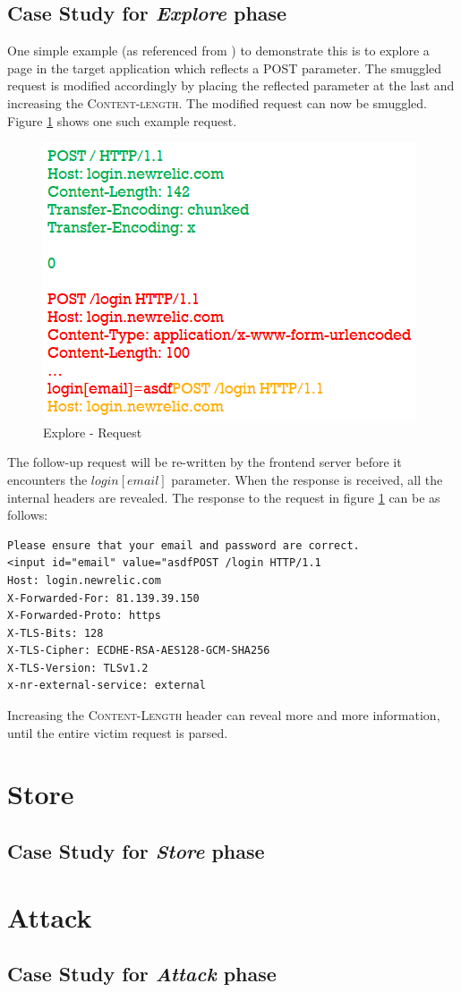 \subsection{Case Study for \textit{Explore} phase}
One simple example (as referenced from \cite{b6}) to demonstrate this is to explore a page in the target application which reflects a POST parameter. The smuggled request is modified accordingly by placing the reflected parameter at the last and increasing the \textsc{Content-length}. The modified request can now be smuggled. Figure \ref{fig:Explore_Request} shows one such example request.\\ 
\begin{figure}
	\includegraphics{images/Explore_Request}
	\caption{Explore - Request}
	\label{fig:Explore_Request}
\end{figure}
The follow-up request will be re-written by the frontend server before it encounters the $login[email]$ parameter. When the response is received, all the internal headers are revealed. 
The response to the request in figure \ref{fig:Explore_Request} can be as follows:
\begin{verbatim}
Please ensure that your email and password are correct.
<input id="email" value="asdfPOST /login HTTP/1.1
Host: login.newrelic.com
X-Forwarded-For: 81.139.39.150
X-Forwarded-Proto: https
X-TLS-Bits: 128
X-TLS-Cipher: ECDHE-RSA-AES128-GCM-SHA256
X-TLS-Version: TLSv1.2
x-nr-external-service: external
\end{verbatim}
Increasing the \textsc{Content-Length} header can reveal more and more information, until the entire victim request is parsed. 

\section{Store}

\subsection{Case Study for \textit{Store} phase}


\section{Attack}
\subsection{Case Study for \textit{Attack} phase}